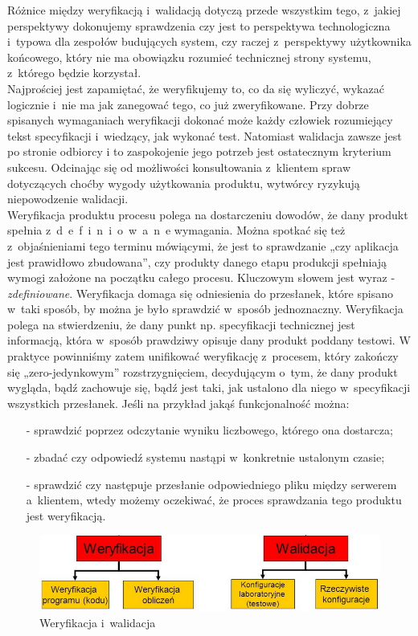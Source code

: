 \documentclass{xmgr}
\begin{document}
 Różnice między weryfikacją i~walidacją dotyczą przede wszystkim tego, z~jakiej perspektywy dokonujemy sprawdzenia czy jest to perspektywa technologiczna i~typowa dla zespołów budujących system, czy raczej z~perspektywy użytkownika końcowego, który nie ma obowiązku rozumieć technicznej strony systemu, z~którego będzie korzystał.
\\
\indent Najprościej jest zapamiętać, że weryfikujemy to, co da się wyliczyć, wykazać logicznie i~nie ma jak zanegować tego, co już zweryfikowane. Przy dobrze spisanych wymaganiach weryfikacji dokonać może każdy człowiek rozumiejący tekst specyfikacji i~wiedzący, jak wykonać test. 
Natomiast walidacja zawsze jest po stronie odbiorcy i to zaspokojenie jego potrzeb jest ostatecznym kryterium sukcesu. Odcinając się od możliwości konsultowania z~klientem spraw dotyczących choćby wygody użytkowania produktu, wytwórcy ryzykują niepowodzenie walidacji.
\\
\indent Weryfikacja produktu procesu polega na dostarczeniu dowodów, że dany produkt spełnia z~d~e~f~i~n~i~o~w~a~n~e wymagania. Można spotkać się też z~objaśnieniami tego terminu mówiącymi, że jest to sprawdzanie „czy aplikacja jest prawidłowo zbudowana”, czy produkty danego etapu produkcji spełniają wymogi założone na początku całego procesu.
Kluczowym słowem jest wyraz -  \textit{zdefiniowane}. Weryfikacja domaga się odniesienia do przesłanek, które spisano w~taki sposób, by można je było sprawdzić w~sposób jednoznaczny. Weryfikacja polega na stwierdzeniu, że dany punkt np. specyfikacji technicznej jest informacją, która w~sposób prawdziwy opisuje dany produkt poddany testowi. W praktyce powinniśmy zatem unifikować weryfikację z~procesem, który zakończy się „zero-jedynkowym” rozstrzygnięciem, decydującym o~tym, że dany produkt wygląda, bądź zachowuje się, bądź jest taki, jak ustalono dla niego w~specyfikacji wszystkich przesłanek. Jeśli na przykład jakąś funkcjonalność można:
\begin{itemize}
  \item[-] sprawdzić poprzez odczytanie wyniku liczbowego, którego ona dostarcza; 
  \item[-] zbadać czy odpowiedź systemu nastąpi w~konkretnie ustalonym czasie;
  \item[-] sprawdzić czy następuje przesłanie odpowiedniego pliku między serwerem a~klientem,
wtedy możemy oczekiwać, że proces sprawdzania tego produktu jest weryfikacją.
\end{itemize}


\begin{figure}[th!]
\centering
\includegraphics[width=.7\hsize]{images/weryfikacja_walidacja}
\caption{Weryfikacja i~walidacja\label{RYS.2}}
\end{figure}
\end{document}
